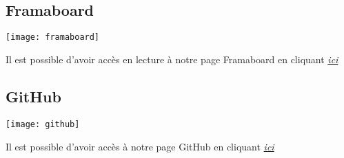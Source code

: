 ~\\
~\\

\subsection{Framaboard}
\begin{center}
\texttt{[image: framaboard]}
\end{center}
Il est possible d'avoir accès en lecture à notre page Framaboard en cliquant  \textit{\href{https://smart.framaboard.org/?controller=board&action=readonly&token=ab1e20bb26472df067dc24cbd84d9b28eea71bfd68bdea07ab5a9b555ce0}{ici}}

\subsection{GitHub}
\begin{center}
\texttt{[image: github]}
\end{center}
Il est possible d'avoir accès à notre page GitHub en cliquant  \textit{\href{https://github.com/magichal/SMART}{ici}}






  


